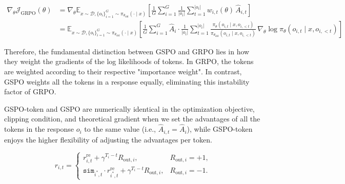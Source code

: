 \begin{align*}
\nabla_\theta \mathcal{J}_{\mathrm{GRPO}}(\theta)
&= \nabla_\theta \mathbb{E}_{x \sim \mathcal{D}, \{o_i\}_{i=1}^G \sim \pi_{\theta_{\text{old}}}(\cdot \mid x)}
\left[
\frac{1}{G} \sum_{i=1}^G \frac{1}{|o_i|} \sum_{t=1}^{|o_i|} w_{i,t}(\theta)\, \hat{A}_{i,t}
\right] \\
&= \mathbb{E}_{x \sim \mathcal{D}, \{o_i\}_{i=1}^G \sim \pi_{\theta_{\text{old}}}(\cdot \mid x)}
\left[
\frac{1}{G} \sum_{i=1}^G \hat{A}_i \cdot \frac{1}{|o_i|}
\sum_{t=1}^{|o_i|}
\frac{\pi_\theta(o_{i,t} \mid x, o_{i,<t})}
{\pi_{\theta_{\text{old}}}(o_{i,t} \mid x, o_{i,<t})}
\, \nabla_\theta \log \pi_\theta(o_{i,t} \mid x, o_{i,<t})
\right]
\end{align*}

Therefore, the fundamental distinction between GSPO and GRPO lies in how they weight the gradients of the log likelihoods of tokens. In GRPO, the tokens are weighted according to their respective "importance  weight". In contrast, GSPO weights all the tokens in a response equally, eliminating this instability factor of GRPO.

GSPO-token and GSPO are numerically identical in the optimization objective, clipping condition, and theoretical gradient when we set the  advantages of all the tokens in the response $o_i$ to the same value (i.e., $\hat A_{i,t} = \hat A_i$), while GSPO-token enjoys the higher flexibility of adjusting the advantages per token.


\begin{equation}
  r_{i,t} =
  \begin{cases}
    r^{\mathrm{re}}_{i,t} + \gamma^{T_i-t}R_{\text{out},i}, & R_{\mathrm{out},i}=+1,\\[4pt]
    \texttt{sim}_{i^*,t}\cdot r^{\mathrm{re}}_{i^*,t} + \gamma^{T_i-t}R_{\text{out},i}, & R_{\mathrm{out},i}=-1.
  \end{cases}
\end{equation}